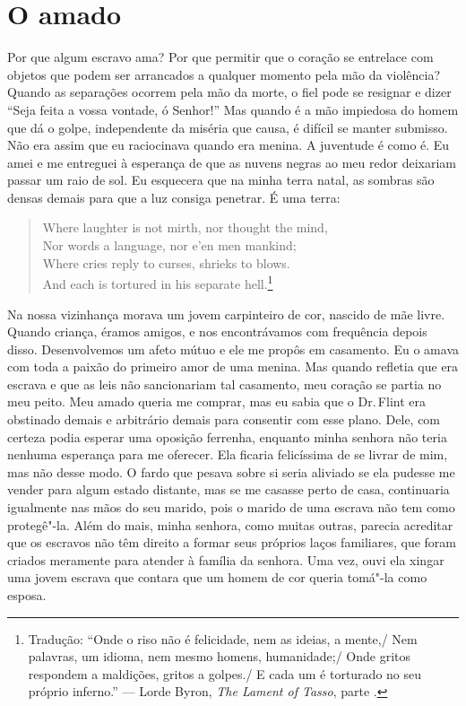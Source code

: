 \chapter*{O amado}

Por que algum escravo ama? Por que
permitir que o coração se entrelace com objetos que podem ser arrancados
a qualquer momento pela mão da violência? Quando as separações ocorrem
pela mão da morte, o fiel pode se resignar e dizer ``Seja feita a vossa
vontade, ó Senhor!'' Mas quando é a mão impiedosa do homem que dá o
golpe, independente da miséria que causa, é difícil se manter submisso.
Não era assim que eu raciocinava quando era menina. A juventude é como
é. Eu amei e me entreguei à esperança de que as nuvens negras ao meu
redor deixariam passar um raio de sol. Eu esquecera que na minha terra
natal, as sombras são densas demais para que a luz consiga penetrar. É
uma terra:

\begin{verse}
Where laughter is not mirth, nor thought the \qb mind,\\
Nor words a language, nor e'en men \qb mankind;\\
Where cries reply to curses, shrieks to blows.\\
And each is tortured in his separate hell.\footnote{Tradução: ``Onde o riso não é felicidade, nem as ideias, a mente,/ Nem palavras, um idioma, nem mesmo homens,
humanidade;/ Onde gritos respondem a maldições, gritos a golpes./ E
cada um é torturado no seu próprio inferno.'' --- Lorde Byron, \emph{The Lament
of Tasso}, parte .}
\end{verse}

Na nossa vizinhança morava um jovem
carpinteiro de cor, nascido de mãe livre. Quando criança, éramos amigos,
e nos encontrávamos com frequência depois disso. Desenvolvemos um afeto
mútuo e ele me propôs em casamento. Eu o amava com toda a paixão do
primeiro amor de uma menina. Mas quando refletia que era escrava e que
as leis não sancionariam tal casamento, meu coração se partia no meu
peito. Meu amado queria me comprar, mas eu sabia que o Dr.\,Flint era
obstinado demais e arbitrário demais para consentir com esse plano.
Dele, com certeza podia esperar uma oposição ferrenha, enquanto minha
senhora não teria nenhuma esperança para me oferecer. Ela ficaria
felicíssima de se livrar de mim, mas não desse modo. O fardo que pesava
sobre si seria aliviado se ela pudesse me vender para algum estado
distante, mas se me casasse perto de casa, continuaria igualmente nas
mãos do seu marido, pois o marido de uma escrava não tem como
protegê"-la. Além do mais, minha senhora, como muitas outras, parecia
acreditar que os escravos não têm direito a formar seus próprios laços
familiares, que foram criados meramente para atender à família da
senhora. Uma vez, ouvi ela xingar uma jovem escrava que contara que um
homem de cor queria tomá"-la como esposa.

